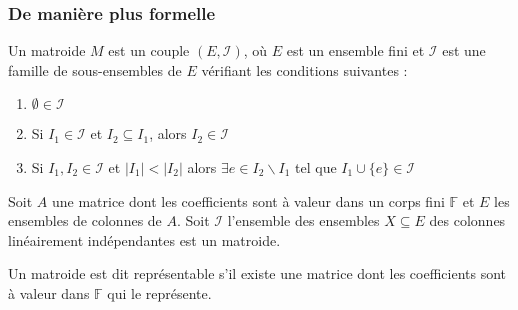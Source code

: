 \documentclass[9pt]{beamer}
\begin{document}
\begin{frame}
    \frametitle{De manière plus formelle}
    \begin{df}[Matroide]
        Un matroide $M$ est un couple $(E, \mathcal{I})$, où $E$ est un ensemble fini et
        $\mathcal{I}$ est une famille de sous-ensembles de $E$ vérifiant les conditions suivantes :
        \begin{enumerate}
            \item $\emptyset \in \mathcal{I}$
            \item Si $I_1 \in \mathcal{I}$ et $I_2 \subseteq I_1$, alors $I_2 \in \mathcal{I}$
            \item Si $I_1, I_2 \in \mathcal{I}$ et $|I_1| < |I_2|$ alors $\exists e \in I_2
                \backslash I_1$ tel que $I_1 \cup \{e\} \in \mathcal{I}$
        \end{enumerate}
    \end{df}

    \vfill
    \pause

    \begin{prop}
        Soit $A$ une matrice dont les coefficients sont à valeur dans un corps fini $\mathbb{F}$ et
        $E$ les ensembles de colonnes de $A$. Soit $\mathcal{I}$ l'ensemble des ensembles $X
        \subseteq E$ des colonnes linéairement indépendantes est un matroide.
    \end{prop}

    \vfill
    \pause

    \begin{df}
        Un matroide est dit représentable s'il existe une matrice dont les coefficients sont à
        valeur dans $\mathbb{F}$ qui le représente.
    \end{df}

\end{frame}
\end{document}
